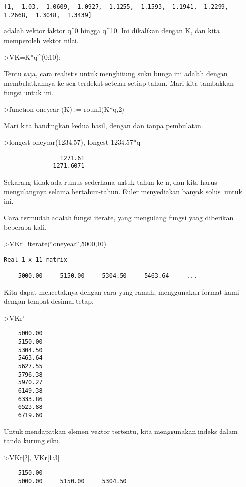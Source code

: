 \documentclass[
]{book}
\begin{document}
\begin{verbatim}
[1,  1.03,  1.0609,  1.0927,  1.1255,  1.1593,  1.1941,  1.2299,
1.2668,  1.3048,  1.3439]
\end{verbatim}

adalah vektor faktor q\^{}0 hingga q\^{}10. Ini dikalikan dengan K, dan kita memperoleh vektor nilai.

\textgreater VK=K*q\^{}(0:10);

Tentu saja, cara realistis untuk menghitung suku bunga ini adalah dengan membulatkannya ke sen terdekat setelah setiap tahun. Mari kita tambahkan fungsi untuk ini.

\textgreater function oneyear (K) := round(K*q,2)

Mari kita bandingkan kedua hasil, dengan dan tanpa pembulatan.

\textgreater longest oneyear(1234.57), longest 1234.57*q

\begin{verbatim}
                1271.61 
              1271.6071 
\end{verbatim}

Sekarang tidak ada rumus sederhana untuk tahun ke-n, dan kita harus mengulangnya selama bertahun-tahun. Euler menyediakan banyak solusi untuk ini.

Cara termudah adalah fungsi iterate, yang mengulang fungsi yang diberikan beberapa kali.

\textgreater VKr=iterate(``oneyear'',5000,10)

\begin{verbatim}
Real 1 x 11 matrix

    5000.00     5150.00     5304.50     5463.64     ...
\end{verbatim}

Kita dapat mencetaknya dengan cara yang ramah, menggunakan format kami dengan tempat desimal tetap.

\textgreater VKr'

\begin{verbatim}
    5000.00 
    5150.00 
    5304.50 
    5463.64 
    5627.55 
    5796.38 
    5970.27 
    6149.38 
    6333.86 
    6523.88 
    6719.60 
\end{verbatim}

Untuk mendapatkan elemen vektor tertentu, kita menggunakan indeks dalam tanda kurung siku.

\textgreater VKr{[}2{]}, VKr{[}1:3{]}

\begin{verbatim}
    5150.00 
    5000.00     5150.00     5304.50 
\end{verbatim}
\end{document}
